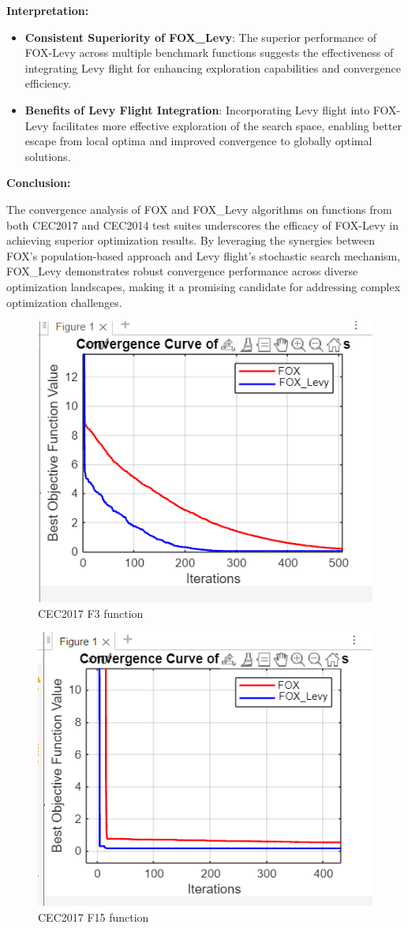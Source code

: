 \documentclass[
]{article}
\begin{document}
\begin{justify}
{\textbf{Interpretation:}

\begin{itemize}
    \item \textbf{Consistent Superiority of FOX\_Levy}: The superior performance of FOX-Levy across multiple benchmark functions suggests the effectiveness of integrating Levy flight for enhancing exploration capabilities and convergence efficiency.
\end{itemize}
\begin{itemize}
    \item \textbf{Benefits of Levy Flight Integration}: Incorporating Levy flight into FOX-Levy facilitates more effective exploration of the search space, enabling better escape from local optima and improved convergence to globally optimal solutions.
\end{itemize}

\begin{adjustwidth}{1cm}{}
\textbf{Conclusion:}

The convergence analysis of FOX and FOX\_Levy algorithms on functions from both CEC2017 and CEC2014 test suites underscores the efficacy of FOX-Levy in achieving superior optimization results. By leveraging the synergies between FOX's population-based approach and Levy flight's stochastic search mechanism, FOX\_Levy demonstrates robust convergence performance across diverse optimization landscapes, making it a promising candidate for addressing complex optimization challenges.
\end{adjustwidth}

\begin{figure}[h]
    \centering
    \includegraphics[width=0.5\linewidth]{Screenshot 2024-04-08 012525.png}
    \caption{CEC2017 F3 function}
    \label{fig:cec2017-f3}
\end{figure}

\begin{figure}[h!]
    \centering
    \includegraphics[width=0.5\linewidth]{Screenshot 2024-04-08 012758.png}
    \caption{CEC2017 F15 function}
    \label{fig:cec2017-f15}
\end{figure}

}
\end{justify}
\end{document}
